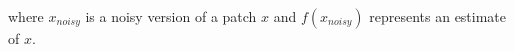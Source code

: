 \documentclass[8pt]{beamer}
\begin{document}
\begin{frame}
\begin{figure}[h]
\begin{minipage}[c]{9.5cm}
{
}%
\end{minipage}%
\end{figure}

\vspace{7pt}

where $x_{noisy}$ is a noisy version of a patch $x$ and $f(x_{noisy})$ represents an estimate of $x$.

\end{frame}


\begin{frame}

\end{frame}

\begin{frame}
\end{frame}

\begin{frame}
\end{frame}

\begin{frame}
\end{frame}


\begin{frame}
\end{frame}






\section*{}
\end{document}
